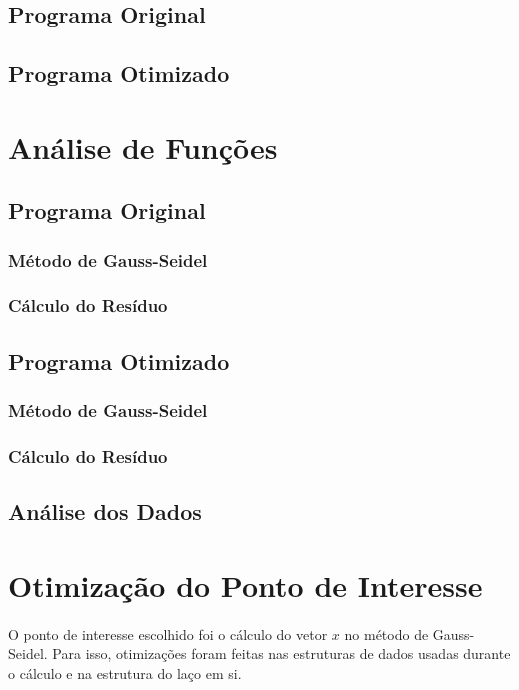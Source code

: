 \documentclass[12pt]{article}
\begin{document}
	\subsection{Programa Original}
	\subsection{Programa Otimizado}
\newpage

\section{Análise de Funções}

	\subsection{Programa Original}
		\subsubsection{Método de Gauss-Seidel}
		\subsubsection{Cálculo do Resíduo}
	
	\subsection{Programa Otimizado}
		\subsubsection{Método de Gauss-Seidel}
		\subsubsection{Cálculo do Resíduo}

	\subsection{Análise dos Dados}

\newpage

\section{Otimização do Ponto de Interesse}

\paragraph{}
O ponto de interesse escolhido foi o cálculo do vetor $x$ no método de Gauss-Seidel.
Para isso, otimizações foram feitas nas estruturas de dados usadas durante o cálculo e na estrutura do laço em si.
\end{document}

